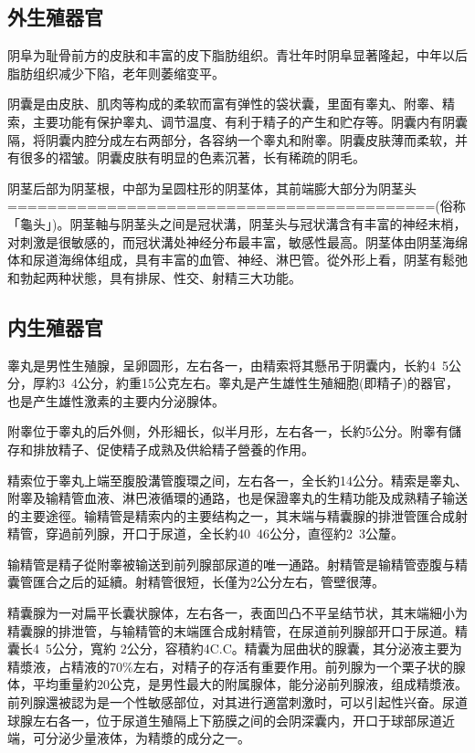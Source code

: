 \documentclass[12pt,UTF8]{ctexbook}
\begin{document}
\subsection{外生殖器官}

阴阜为耻骨前方的皮肤和丰富的皮下脂肪组织。青壮年时阴阜显著隆起，中年以后脂肪组织减少下陷，老年则萎缩变平。

阴囊是由皮肤、肌肉等构成的柔软而富有弹性的袋状囊，里面有睾丸、附睾、精索，主要功能有保护睾丸、调节温度、有利于精子的产生和贮存等。阴囊内有阴囊隔，将阴囊内腔分成左右两部分，各容纳一个睾丸和附睾。阴囊皮肤薄而柔软，并有很多的褶皱。阴囊皮肤有明显的色素沉著，长有稀疏的阴毛。

阴茎后部为阴茎根，中部为呈圆柱形的阴茎体，其前端膨大部分为阴茎头===========================================(俗称「龜头」)。阴茎軸与阴茎头之间是冠状溝，阴茎头与冠状溝含有丰富的神经末梢，对刺激是很敏感的，而冠状溝处神经分布最丰富，敏感性最高。阴茎体由阴茎海绵体和尿道海绵体组成，具有丰富的血管、神经、淋巴管。從外形上看，阴茎有鬆弛和勃起两种状態，具有排尿、性交、射精三大功能。

\subsection{内生殖器官}

睾丸是男性生殖腺，呈卵圆形，左右各一，由精索将其懸吊于阴囊内，长約4~5公分，厚約3~4公分，約重15公克左右。睾丸是产生雄性生殖細胞(即精子)的器官，也是产生雄性激素的主要内分泌腺体。

附睾位于睾丸的后外侧，外形細长，似半月形，左右各一，长約5公分。附睾有儲存和排放精子、促使精子成熟及供給精子營養的作用。

精索位于睾丸上端至腹股溝管腹環之间，左右各一，全长約14公分。精索是睾丸、附睾及输精管血液、淋巴液循環的通路，也是保證睾丸的生精功能及成熟精子输送的主要途徑。输精管是精索内的主要结构之一，其末端与精囊腺的排泄管匯合成射精管，穿過前列腺，开口于尿道，全长約40~46公分，直徑約2~3公釐。

输精管是精子從附睾被输送到前列腺部尿道的唯一通路。射精管是输精管壺腹与精囊管匯合之后的延續。射精管很短，长僅为2公分左右，管壁很薄。

精囊腺为一对扁平长囊状腺体，左右各一，表面凹凸不平呈结节状，其末端細小为精囊腺的排泄管，与输精管的末端匯合成射精管，在尿道前列腺部开口于尿道。精囊长4~5公分，寬約 2公分，容積約4C.C。精囊为屈曲状的腺囊，其分泌液主要为精漿液，占精液的70\%左右，对精子的存活有重要作用。前列腺为一个栗子状的腺体，平均重量約20公克，是男性最大的附属腺体，能分泌前列腺液，组成精漿液。前列腺還被認为是一个性敏感部位，对其进行適當刺激时，可以引起性兴奋。尿道球腺左右各一，位于尿道生殖隔上下筋膜之间的会阴深囊内，开口于球部尿道近端，可分泌少量液体，为精漿的成分之一。
\end{document}
